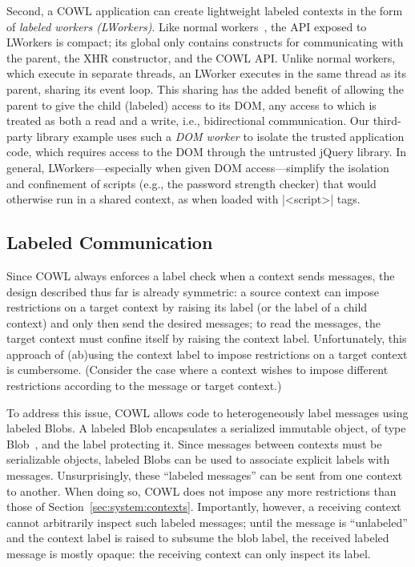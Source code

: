 Second, a COWL application can create lightweight labeled contexts in
the form of \emph{labeled workers (LWorkers)}.
%
Like normal workers~\cite{workers}, the API exposed to LWorkers is
compact; its global only contains constructs for communicating with
the parent, the XHR constructor, and the COWL API.
%
Unlike normal workers, which execute in separate threads, an LWorker
executes in the same thread as its parent, sharing its event loop.
%
This sharing has the added benefit of allowing the parent to give the
child (labeled) access to its DOM, any access to which is treated as
both a read and a write, i.e., bidirectional communication.
%
Our third-party library example uses such a \emph{DOM worker} to
isolate the trusted application code, which requires access to the DOM
through the untrusted jQuery library.
%
In general, LWorkers---especially when given DOM access---simplify the
isolation and confinement of scripts (e.g., the password strength
checker) that would otherwise run in a shared context, as when loaded
with \js|<script>| tags.

\subsection{Labeled Communication}
\label{sec:system:communication}
Since COWL always enforces a label check when a context sends
messages, the design described thus far is already symmetric: a source
context can impose restrictions on a target context by raising its
label (or the label of a child context) and only then send the desired
messages; to read the messages, the target context must confine itself
by raising the context label.
%
Unfortunately, this approach of (ab)using the context label to impose
restrictions on a target context is cumbersome.
%
(Consider the case where a context wishes to impose different
restrictions according to the message or target context.)

To address this issue, COWL allows code to heterogeneously label
messages using labeled Blobs.
%
A labeled Blob encapsulates a serialized immutable object, of type
Blob~\cite{html5}, and the label protecting it.
%
Since messages between contexts must be serializable objects, labeled
Blobs can be used to associate explicit labels with messages.
%
Unsurprisingly, these ``labeled messages'' can be sent from one
context to another.
%
When doing so, COWL does not impose any more restrictions than those of
Section~\ref{sec:system:contexts}.
%
Importantly, however, a receiving context cannot arbitrarily inspect
such labeled messages;
%
until the message is ``unlabeled'' and the context label is raised to
subsume the blob label, the received labeled message is mostly opaque:
the receiving context can only inspect its label.

